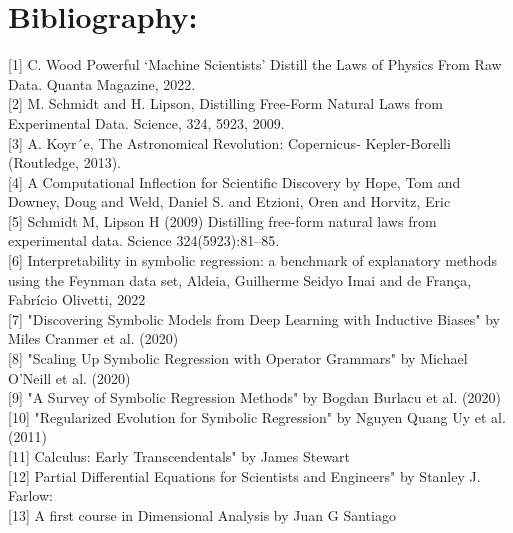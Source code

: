 \documentclass{article}
\begin{document}
\section{Bibliography: }

[1] C. Wood Powerful ‘Machine Scientists’ Distill the Laws of Physics From Raw Data. Quanta Magazine, 2022.\\ 

[2] M. Schmidt and H. Lipson, Distilling Free-Form Natural Laws from Experimental Data. Science, 324, 5923,
2009.\\

[3] A. Koyr´e, The Astronomical Revolution: Copernicus-
Kepler-Borelli (Routledge, 2013).\\ 

[4] A Computational Inflection for Scientific Discovery by Hope, Tom and Downey, Doug and Weld, Daniel S. and Etzioni, Oren and Horvitz, Eric\\

[5] Schmidt M, Lipson H (2009) Distilling free-form natural laws from experimental data. Science
324(5923):81–85. \\

[6] Interpretability in symbolic regression: a benchmark of explanatory methods using the Feynman data set, Aldeia, Guilherme Seidyo Imai and de França, Fabrício Olivetti, 2022 \\ 

[7] "Discovering Symbolic Models from Deep Learning with Inductive Biases" by Miles Cranmer et al. (2020)\\ 

[8] "Scaling Up Symbolic Regression with Operator Grammars" by Michael O'Neill et al. (2020)\\ 

[9] "A Survey of Symbolic Regression Methods" by Bogdan Burlacu et al. (2020)\\ 

[10] "Regularized Evolution for Symbolic Regression" by Nguyen Quang Uy et al. (2011) \\ 

[11] Calculus: Early Transcendentals" by James Stewart\\ 

[12] Partial Differential Equations for Scientists and Engineers" by Stanley J. Farlow:\\ 

[13] A first course in Dimensional Analysis by Juan G Santiago\\ 
\end{document}
